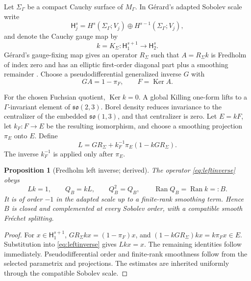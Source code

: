 \documentclass[11pt]{article}
\newtheorem{proposition}[theorem]{Proposition}
\theoremstyle{definition}
\theoremstyle{remark}
\newcommand{\M}{M_{\Gamma}}
\newcommand{\Ker}{\operatorname{Ker}}
\newcommand{\Ran}{\operatorname{Ran}}
\begin{document}
Let $\Sigma_\Gamma$ be a compact Cauchy surface of $\M$.  In G\'erard's adapted
Sobolev scale write
\begin{equation}
 \mathsf H_j^s=H^s(\Sigma_\Gamma;V_j)\oplus
 H^{s-1}(\Sigma_\Gamma;V_j),
\end{equation}
and denote the Cauchy gauge map by
\begin{equation}
 k=K_\Sigma:\mathsf H_1^{s+1}\longrightarrow\mathsf H_2^s.
\end{equation}
G\'erard's gauge-fixing map gives an operator $R_\Sigma$ such that
$A=R_\Sigma k$ is Fredholm of index zero and has an elliptic first-order diagonal
part plus a smoothing remainder \cite{Gerard2023}.  Choose a pseudodifferential
generalized inverse $G$ with
\begin{equation}
 GA=1-\pi_F,
 \qquad F=\Ker A.
\end{equation}

For the chosen Fuchsian quotient, $\Ker k=0$.  A global Killing one-form lifts to a
$\Gamma$-invariant element of $\mathfrak{so}(2,3)$.  Borel density reduces invariance
to the centralizer of the embedded $\mathfrak{so}(1,3)$, and that centralizer is zero.
Let $E=kF$, let $k_F:F\to E$ be the resulting isomorphism, and choose a smoothing
projection $\pi_E$ onto $E$.  Define
\begin{equation}
 L=GR_\Sigma+k_F^{-1}\pi_E(1-kGR_\Sigma).
 \label{eq:leftinverse}
\end{equation}
The inverse $k_F^{-1}$ is applied only after $\pi_E$.

\begin{proposition}[Fredholm left inverse; derived]
The operator \cref{eq:leftinverse} obeys
\begin{equation}
 Lk=1,
 \qquad Q_B=kL,
 \qquad Q_B^2=Q_B,
 \qquad \Ran Q_B=\Ran k=:B.
 \label{eq:projectB}
\end{equation}
It is of order $-1$ in the adapted scale up to a finite-rank smoothing term.  Hence
$B$ is closed and complemented at every Sobolev order, with a compatible smooth
Fr\'echet splitting.
\end{proposition}

\begin{proof}
For $x\in\mathsf H_1^{s+1}$,
$GR_\Sigma kx=(1-\pi_F)x$, and
$(1-kGR_\Sigma)kx=k\pi_Fx\in E$.  Substitution into
\cref{eq:leftinverse} gives $Lkx=x$.  The remaining identities follow immediately.
Pseudodifferential order and finite-rank smoothness follow from the selected parametrix
and projections.  The estimates are inherited uniformly through the compatible
Sobolev scale.
\end{proof}
\end{document}
